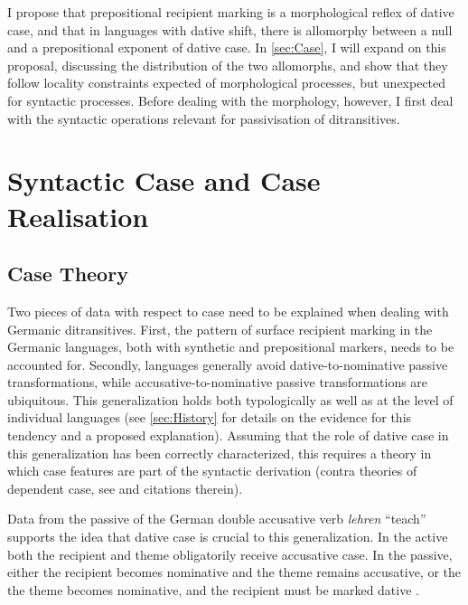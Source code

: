 I propose that prepositional recipient marking is a morphological reflex of dative case, and that in languages with dative shift, there is allomorphy between a null and a prepositional exponent of dative case. In \autoref{sec:Case}, I will expand on this proposal, discussing the distribution of the two allomorphs, and show that they follow locality constraints expected of morphological processes, but unexpected for syntactic processes. Before dealing with the morphology, however, I first deal with the syntactic operations relevant for passivisation of ditransitives.

\section{Syntactic Case and Case Realisation}\label{sec:Case}
\subsection{Case Theory}
Two pieces of data with respect to case need to be explained when dealing with Germanic ditransitives. First, the pattern of surface recipient marking in the Germanic languages, both with synthetic and prepositional markers, needs to be accounted for. Secondly, languages generally avoid dative-to-nominative passive transformations, while accusative-to-nominative passive transformations are ubiquitous. This generalization holds both typologically as well as at the level of individual languages (see \autoref{sec:History} for details on the evidence for this tendency and a proposed explanation). Assuming that the role of dative case in this generalization has been correctly characterized, this requires a theory in which case features are part of the syntactic derivation (contra theories of dependent case, see \cite{McFadden.2004} and citations therein).

Data from the passive of the German double accusative verb \emph{lehren} ``teach'' supports the idea that dative case is crucial to this generalization. In the active both the recipient and theme obligatorily receive accusative case. In the passive, either the recipient becomes nominative and the theme remains accusative, or the the theme becomes nominative, and the recipient must be marked dative \citep{Alexiadou.2013b}.

